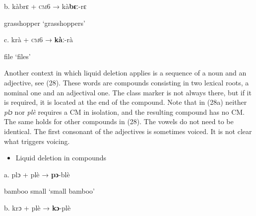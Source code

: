 \begin{styleindexi}
          b.  kàbrɛ            +        \textsc{cm}6                      →          kà\textbf{bɛ}ː{}-rɛ           
\end{styleindexi}

\begin{styleindexi}
              grasshopper                                                 ‘grasshoppers’
\end{styleindexi}

\begin{styleindexi}
          c.  krà                +        \textsc{cm}6                     →          \textbf{kàː}{}-rà              
\end{styleindexi}

\begin{styleindexi}
              file                                                            ‘files’
\end{styleindexi}

Another context in which liquid deletion applies is a sequence of a noun and an adjective, see (28). These words are compounds consisting in two lexical roots, a nominal one and an adjectival one. The class marker is not always there, but if it is required, it is located at the end of the compound. Note that in (28a) neither \textit{plɔ} nor \textit{plè} requires a CM in isolation, and the resulting compound has no CM. The same holds for other compounds in (28). The vowels do not need to be identical. The first consonant of the adjectives is sometimes voiced. It is not clear what triggers voicing.

\begin{itemize}
\item \begin{styleindexi}
    \label{bkm:Ref476130860}Liquid deletion in compounds            
\end{styleindexi}\end{itemize}
\begin{styleindexi}
          a.   plɔ           +      plè                           →          \textbf{pɔ}{}-blè                     
\end{styleindexi}

\begin{styleindexi}
                 bamboo          small                                   ‘small bamboo’  
\end{styleindexi}

\begin{styleindexi}
          b.   krɔ           +      plè                           →          \textbf{kɔ}{}-plè  
\end{styleindexi}

